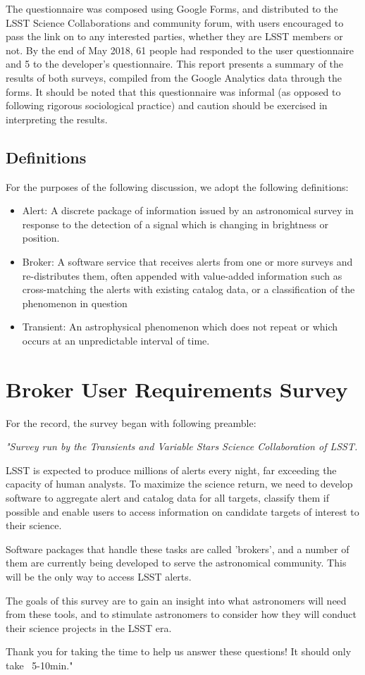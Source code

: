 \documentclass{article}
\begin{document}
The questionnaire was composed using Google Forms, and distributed to the LSST Science Collaborations and community forum, with users encouraged to pass the link on to any interested parties, whether they are LSST members or not.  By the end of May 2018, 61 people had responded to the user questionnaire and 5 to the developer's questionnaire.  This report presents a summary of the results of both surveys, compiled from the Google Analytics data through the forms.  It should be noted that this questionnaire was informal (as opposed to following rigorous sociological practice) and caution should be exercised in interpreting the results.  

\subsection{Definitions}

For the purposes of the following discussion, we adopt the following definitions:

\begin{itemize}
\item Alert: A discrete package of information issued by an astronomical survey in response to the detection of a signal which is changing in brightness or position.
\item Broker: A software service that receives alerts from one or more surveys and re-distributes them, often appended with value-added information such as cross-matching the alerts with existing catalog data, or a classification of the phenomenon in question
\item Transient: An astrophysical phenomenon which does not repeat or which occurs at an unpredictable interval of time.  
\end{itemize}

\section{Broker User Requirements Survey}

For the record, the survey began with following preamble:

{\em "Survey run by the Transients and Variable Stars Science Collaboration of LSST.  

LSST is expected to produce millions of alerts every night, far exceeding the capacity of human analysts.  To maximize the science return, we need to develop software to aggregate alert and catalog data for all targets, classify them if possible and enable users to access information on candidate targets of interest to their science.

Software packages that handle these tasks are called 'brokers', and a number of them are currently being developed to serve the astronomical community.  This will be the only way to access LSST alerts.

The goals of this survey are to gain an insight into what astronomers will need from these tools, and to stimulate astronomers to consider how they will conduct their science projects in the LSST era.
 
Thank you for taking the time to help us answer these questions!   It should only take ~5-10min."}
\end{document}
